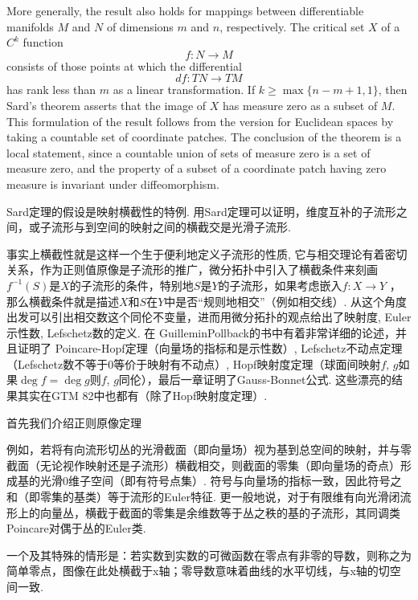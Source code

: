 \documentclass[options]{article}
\begin{document}
\begin{remark}
	More generally, the result also holds for mappings between differentiable manifolds $M$ and $N$ of dimensions $m$ and $n$, respectively. The critical set $X$ of a $C^k$ function
	\[
			f: N \rightarrow M
	\]
	consists of those points at which the differential
	\[
			d f: T N \rightarrow T M
	\]
	has rank less than $m$ as a linear transformation. If $k \geq \max \{n-m+1,1\}$, then Sard's theorem asserts that the image of $X$ has measure zero as a subset of $M$. This formulation of the result follows from the version for Euclidean spaces by taking a countable set of coordinate patches. The conclusion of the theorem is a local statement, since a countable union of sets of measure zero is a set of measure zero, and the property of a subset of a coordinate patch having zero measure is invariant under diffeomorphism.
\end{remark}

Sard定理的假设是映射横截性的特例. 用Sard定理可以证明，维度互补的子流形之间，或子流形与到空间的映射之间的横截交是光滑子流形. 

事实上横截性就是这样一个生于便利地定义子流形的性质, 它与相交理论有着密切关系，作为正则值原像是子流形的推广，微分拓扑中引入了横截条件来刻画$f^{-1}(S)$是$X$的子流形的条件，特别地$S$是$Y$的子流形，如果考虑嵌入$f \colon X \to Y$ ，那么横截条件就是描述$X$和$S$在$Y$中是否``规则地相交''（例如相交线）. 从这个角度出发可以引出相交数这个同伦不变量，进而用微分拓扑的观点给出了映射度, Euler示性数, Lefschetz数的定义. 在 GuilleminPollback的书中有着非常详细的论述，并且证明了 Poincare-Hopf定理（向量场的指标和是示性数）, Lefschetz不动点定理（Lefschetz数不等于$0$等价于映射有不动点）, Hopf映射度定理（球面间映射$f$, $g$如果$\deg f = \deg g$则$f$, $g$同伦），最后一章证明了Gauss-Bonnet公式. 这些漂亮的结果其实在GTM 82中也都有（除了Hopf映射度定理）.

首先我们介绍正则原像定理
\begin{remark}
	
\end{remark}

例如，若将有向流形切丛的光滑截面（即向量场）视为基到总空间的映射，并与零截面（无论视作映射还是子流形）横截相交，则截面的零集（即向量场的奇点）形成基的光滑$0$维子空间（即有符号点集）. 符号与向量场的指标一致，因此符号之和（即零集的基类）等于流形的Euler特征. 更一般地说，对于有限维有向光滑闭流形上的向量丛，横截于截面的零集是余维数等于丛之秩的基的子流形，其同调类Poincare对偶于丛的Euler类. 

一个及其特殊的情形是：若实数到实数的可微函数在零点有非零的导数，则称之为简单零点，图像在此处横截于x轴；零导数意味着曲线的水平切线，与x轴的切空间一致. 
\end{document}
